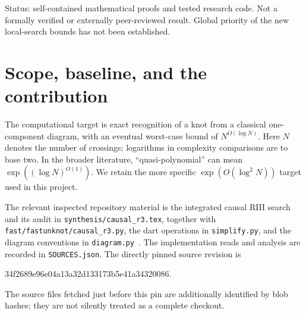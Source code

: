\documentclass[11pt]{article}
\theoremstyle{definition}
\newcommand{\poly}{\operatorname{poly}}
\newcommand{\code}[1]{\texttt{#1}}
\begin{document}
\begin{titlepage}
\begin{abstract}
This strengthens a component of the recognition pipeline, not the general
recognition theorem. If the actual deterministic simplification run has
unlocking budget $g$ and residual core size $r$, exact recognition costs
$\poly(N,g)2^{O(g)}+2^{O(r)}$; thus $g,r=O(\log^2 N)$ suffice for the
specific target $N^{O(\log N)}$. No uniform such bounds are established.
The accompanying standard-library Python kernels, certificate verifier,
27 unit tests, exhaustive Boolean comparisons, and actual-diagram audits
make the local claims reproducible. Paired timings show fewer interleavings
but no demonstrated wall-clock improvement on the measured knot kernels;
no production default change is recommended.
\end{abstract}
\vfill
{\small\sffamily Status: self-contained mathematical proofs and tested research code.
Not a formally verified or externally peer-reviewed result. Global priority
of the new local-search bounds has not been established.\par}
\end{titlepage}
\begingroup
\setlength{\parskip}{0pt}\small
\tableofcontents
\endgroup
\newpage

\section{Scope, baseline, and the contribution}
\label{sec:scope}

The computational target is exact recognition of a knot from a classical
one-component diagram, with an eventual worst-case bound of
$N^{O(\log N)}$. Here $N$ denotes the number of crossings; logarithms in
complexity comparisons are to base two. In the broader literature,
``quasi-polynomial'' can mean $\exp((\log N)^{O(1)})$. We retain the more
specific $\exp(O(\log^2 N))$ target used in this project.

The relevant inspected repository material is the integrated causal RIII
search and its audit in \code{synthesis/causal\_r3.tex}, together with
\code{fast/fastunknot/causal\_r3.py}, the dart operations in
\code{simplify.py}, and the diagram conventions in
\code{diagram.py}~\cite{repo-causal,repo-code,repo-simplify,repo-diagram}.
The implementation reads and analysis are recorded in \code{SOURCES.json}.
The directly pinned source revision is
\begin{center}\small\ttfamily
34f2689e96e04a13a32d133173b5e41a34320086.
\end{center}
The source files fetched just before this pin are additionally identified by
blob hashes; they are not silently treated as a complete checkout.
\end{document}
